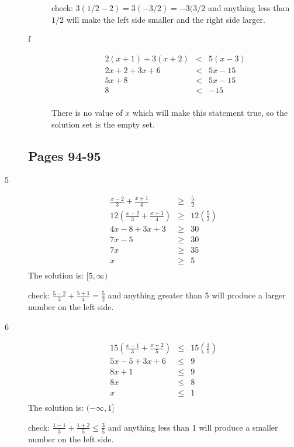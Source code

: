 \documentclass[fleqn,addpoints]{exam}
\begin{document}
\begin{description}
\begin{description}
check: \( 3(1/2 - 2) = 3(-3/2) = -3(3/2 \) and anything less than $1/2$ will make the left side smaller and the right side larger.

  \item[f]
  \begin{eqnarray*}
    2(x + 1) + 3(x + 2) &<& 5(x - 3) \\
    2x + 2 + 3x + 6 &<& 5x - 15 \\
    5x + 8 &<& 5x - 15 \\
    8 &<& -15 \\
  \end{eqnarray*}

There is no value of $x$ which will make this statement true, so the solution set is the empty set.

  \end{description}

\subsection{Pages 94-95} 

\item[5]
\begin{eqnarray*}
  \frac{x-2}{3} + \frac{x+1}{4} &\geq& \frac{5}{2} \\
  12(\frac{x-2}{3} + \frac{x+1}{4}) &\geq& 12(\frac{5}{2}) \\
  4x - 8 + 3x + 3 &\geq& 30 \\
  7x - 5 &\geq& 30 \\
  7x &\geq& 35 \\
  x &\geq& 5 \\
\end{eqnarray*}
The solution is: \( [5, \infty) \)

check: \( \frac{5-2}{3} + \frac{5+1}{4} = \frac{5}{2} \) and anything greater than 5 will produce a larger number on the left side.

\item[6]
\begin{eqnarray*}
  15(\frac{x-1}{3} + \frac{x+2}{5}) &\leq& 15(\frac{3}{5}) \\
  5x - 5 + 3x + 6 &\leq& 9 \\
  8x + 1 &\leq& 9 \\
  8x &\leq& 8 \\
  x &\leq& 1 \\
\end{eqnarray*}
The solution is: \( (-\infty, 1] \)

check: \( \frac{1-1}{3} + \frac{1+2}{5} \leq \frac{3}{5}  \) and anything less than 1 will produce a smaller number on the left side.


\end{description}
\end{document}
